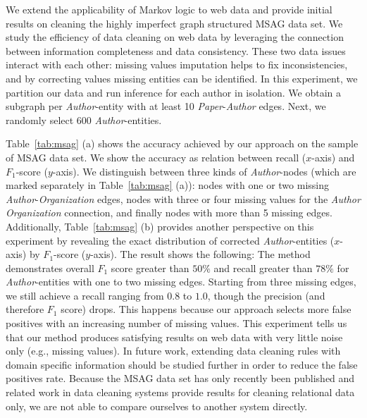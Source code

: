 We extend the applicability of Markov logic to web data and provide initial results on cleaning the highly imperfect graph structured \textsc{MSAG} data set. We study the efficiency of data cleaning on web data by leveraging the connection between information completeness and data consistency. These two data issues interact with each other: missing values imputation helps to fix inconsistencies, and by correcting values missing entities can be identified. %
In this experiment, we partition our data and run inference for each author in isolation. We obtain a subgraph per \textit{Author}-entity with at least 10 \textit{Paper}-\textit{Author} edges. Next, we randomly select 600 \textit{Author}-entities. 

Table~\ref{tab:msag} (a) shows the accuracy achieved by our approach on the sample of \textsc{MSAG} data set. We show the accuracy as relation between recall ($x$-axis) and $F_1$-score ($y$-axis). We distinguish between three kinds of \textit{Author}-nodes (which are marked separately in Table~\ref{tab:msag} (a)): 
nodes with one or two missing \textit{Author}-\textit{Organization} edges, nodes with three or four missing values for the \textit{Author} \textit{Organization} connection, and finally nodes with more than 5 missing edges. Additionally, Table~\ref{tab:msag} (b) provides another perspective on this experiment by revealing the exact distribution of corrected \textit{Author}-entities ($x$-axis) by $F_1$-score ($y$-axis). The result shows the following: The method demonstrates overall $F_1$ score greater than $50\%$ and recall greater than $78\%$ for \textit{Author}-entities with one to two missing edges. Starting from three missing edges, we still achieve a recall ranging from $0.8$ to $1.0$, though the precision (and therefore $F_1$ score) drops. This happens because our approach selects more false positives with an increasing number of missing values. This experiment tells us that our method produces satisfying results on web data with very little noise only (e.g., missing values). In future work, extending data cleaning rules with domain specific information should be studied further in order to reduce the false positives rate. Because the \textsc{MSAG} data set has only recently been published and related work in data cleaning systems provide results for cleaning relational data only, we are not able to compare ourselves to another system directly.

